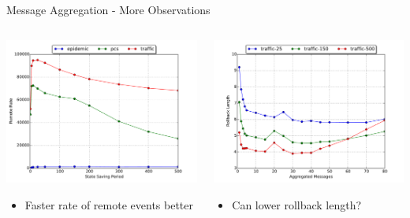 \documentclass[10pt]{beamer}
\begin{document}
\begin{frame}{Message Aggregation - More Observations}

    \begin{columns}

    \begin{column}{0.5\textwidth}
        \includegraphics[width=\textwidth]{../figs/state_saving/beowulf/remote_rate.pdf}
        \begin{itemize}
            \item Faster rate of remote events better
        \end{itemize}
    \end{column}

    \begin{column}{0.5\textwidth}
        \includegraphics[width=\textwidth]{../figs/partitioning_communication/aggregate_traffic_rblength.pdf}
        \begin{itemize}
            \item Can lower rollback length?
        \end{itemize}
    \end{column}


\end{columns}
\end{frame}
\end{document}
